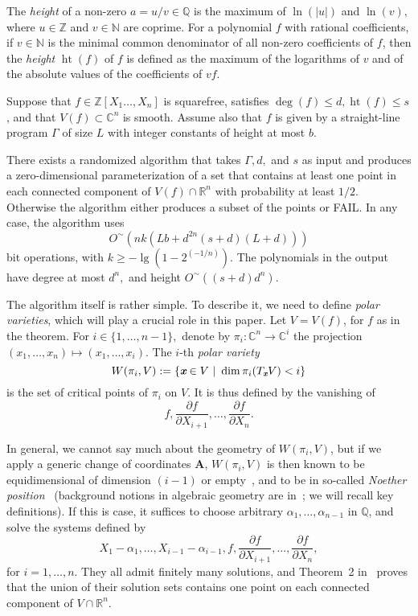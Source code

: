 \documentclass[sigconf]{acmart}
\def\mA{{\bm A}}
\def\xb{\textit{\textbf{x}}}
\DeclareMathOperator{\htt}{ht}
\def\C{\mathbb{C}}
\def\Q{\mathbb{Q}}
\def\R{\mathbb{R}}
\def\pa{\partial}
\newcommand{\ZZ}{{\mathbb{Z}}}
\begin{document}
The {\em height} of a non-zero $a=u/v \in \Q$ is the maximum of
$\ln(|u|)$ and $\ln(v),$ where $u \in \mathbb{Z}$ and $v \in
\mathbb{N}$ are coprime. For a polynomial $f$ with rational
coefficients, if $v \in \mathbb N$ is the minimal common denominator
of all non-zero coefficients of $f$, then the \textit{height}
$\htt(f)$ of $f$ is defined as the maximum of the logarithms of $v$
and of the absolute values of the coefficients of $vf$.

\begin{theorem}\label{theo:main}
  Suppose that $f\in\ZZ[X_1\hdots,X_n]$ is squarefree, satisfies
  $\deg(f) \leq d, \htt(f) \leq s$, and that $V(f) \subset \C^n$ is
  smooth.  Assume also that $f$ is given by a straight-line program
  $\Gamma$ of size $L$ with integer constants of height at most $b.$

  There exists a randomized algorithm that takes $\Gamma, d,$ and $s$
  as input and produces a zero-dimensional parameterization of a set
  that contains at least one point in each connected component of
  $V(f) \cap \R^n$ with probability at least $1/2$. Otherwise the
  algorithm either produces a subset of the points or FAIL. In any
  case, the algorithm uses
  \[
  O^{\sim}(nk(Lb+d^{2n}(s+d)(L+d)))
  \]
  bit operations, with $k \geq -\lg(1-2^{(-1/n)})$. The polynomials in
  the output have degree at most $d^n,$ and height $
  O^{\sim}((s+d)d^n).$
\end{theorem}
The algorithm itself is rather simple. To describe it, we need to
define {\em polar varieties}, which will play a crucial role in this
paper. Let $V=V(f)$, for $f$ as in the theorem. For $i \in
\{1,\hdots,n-1\},$ denote by $\pi_i:\C^n \rightarrow \C^i$ the
projection $(x_1,\hdots,x_n) \mapsto (x_1,\hdots,x_i)$.  The $i$-th
\textit{polar variety} \[W(\pi_i,V) := \{\xb \in V~|~\dim \pi_i(T_\xb
V) < i\}\] is the set of critical points of $\pi_i$ on $V$.  It is
thus defined by the vanishing of \[f,\frac{\pa f}{\pa
  X_{i+1}},\hdots,\frac{\pa f}{\pa X_n}.\]

In general, we cannot say much about the geometry of
$W(\pi_i,V)$, but if we apply a generic change of coordinates $\mA$,
$W(\pi_i,V)$ is then known to be equidimensional of dimension $(i-1)$
or empty~\cite{BaGiHeMb97}, and to be in so-called {\em Noether
  position}~\cite{EMP} (background notions in algebraic geometry are
in~\cite{Mumford76,Shafarevich77,ECA}; we will recall key
definitions). If this is case, it suffices to choose arbitrary
$\alpha_1,\dots,\alpha_{n-1}$ in $\Q$, and solve the systems defined
by
\begin{equation}\label{eq:syst}
X_1-\alpha_1,\dots,X_{i-1}-\alpha_{i-1}, f, \frac{\pa f}{\pa
  X_{i+1}} ,\dots,\frac{\pa f}{\pa X_n},  
\end{equation}
for $i=1,\dots,n$.  They all admit finitely many solutions, and
Theorem~2 in~\cite{EMP} proves that the union of their solution sets
contains one point on each connected component of $V \cap \R^n$.
\end{document}
